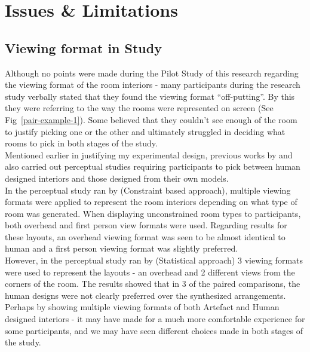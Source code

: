 \section{Issues \& Limitations}
\subsection{Viewing format in Study}
Although no points were made during the Pilot Study of this research regarding the viewing format of the room interiors - many participants during the research study verbally stated that they found the viewing format ``off-putting''. By this they were referring to the way the rooms were represented on screen (See Fig~\ref{pair-example-1}). Some believed that they couldn't see enough of the room to justify picking one or the other and ultimately struggled in deciding what rooms to pick in both stages of the study.
\\
Mentioned earlier in justifying my experimental design, previous works by  \cite{constrained-layouts} and  \cite{make-it-home} also carried out perceptual studies requiring participants to pick between human designed interiors and those designed from their own models.
\\
In the perceptual study ran by  \cite{constrained-layouts} (Constraint based approach), multiple viewing formats were applied to represent the room interiors depending on what type of room was generated. When displaying unconstrained room types to participants, both overhead and first person view formats were used. Regarding results for these layouts, an overhead viewing format was seen to be almost identical to human and a first person viewing format was slightly preferred.
\\
However, in the perceptual study ran by  \cite{make-it-home} (Statistical approach) 3 viewing formats were used to represent the layouts - an overhead and 2 different views from the corners of the room. The results showed that in 3 of the paired comparisons, the human designs were not clearly preferred over the synthesized arrangements.
\\
Perhaps by showing multiple viewing formats of both Artefact and Human designed interiors - it may have made for a much more comfortable experience for some participants, and we may have seen different choices made in both stages of the study.

